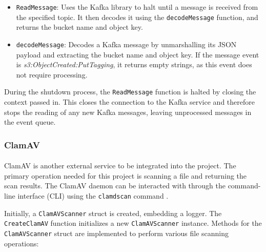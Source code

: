 \documentclass[12pt, conference, final, a4paper, onecolumn, compsoc]{IEEEtran}
\begin{document}
\begin{itemize}
  \item \texttt{ReadMessage}: Uses the Kafka library to halt until a message is
        received from the specified topic. It then decodes it using the
        \texttt{decodeMessage} function, and returns the bucket name and object
        key.
  \item \texttt{decodeMessage}: Decodes a Kafka message by unmarshalling its
        JSON payload and extracting the bucket name and object key. If the
        message event is \textit{s3:ObjectCreated:PutTagging}, it returns empty
        strings, as this event does not require processing.
\end{itemize}

During the shutdown process, the \texttt{ReadMessage} function is halted by
closing the context passed in. This closes the connection to the Kafka service
and therefore stops the reading of any new Kafka messages, leaving unprocessed
messages in the event queue.

\subsubsection*{ClamAV}
\paragraph{}

ClamAV is another external service to be integrated into the project. The
primary operation needed for this project is scanning a file and returning the
scan results. The ClamAV daemon can be interacted with through the command-line
interface (CLI) using the \texttt{clamdscan} command \citep{clamav-repo}.

Initially, a \texttt{ClamAVScanner} struct is created, embedding a logger. The
\texttt{CreateClamAV} function initializes a new \texttt{ClamAVScanner}
instance. Methods for the \texttt{ClamAVScanner} struct are implemented to
perform various file scanning operations:
\end{document}

